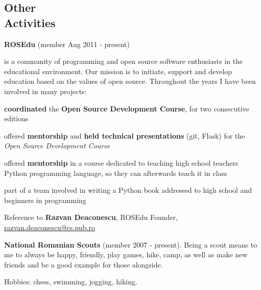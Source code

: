 \documentclass[margin,line]{resume}
\begin{document}
\begin{resume}
    \section{\mysidestyle Other\\Activities}

    \textbf{ROSEdu} (member Aug 2011 - present)
    {\fontsize{2.65mm}{1em}\selectfont
      is a community of
      programming and open source software enthusiasts in the educational environment. Our mission is to
      initiate, support and develop education based on the values of open source.\vspace{1mm}
      Throughout the years I have been involved in many projects:
      \begin{list2}
          \item \textbf{coordinated} the \textbf{Open Source Development Course}, for two consecutive editions
          \item offered \textbf{mentorship} and \textbf{held technical presentations} (git, Flask) for the \textit{Open Source Development Course}
          \item offered \textbf{mentorship} in a course dedicated to teaching high school teachers Python programming language, so they can afterwards teach it in class
          \item part of a team involved in writing a Python book addressed to high school and beginners in programming
      \end{list2}\vspace{-3.5mm}
      Reference to \textbf{Razvan Deaconescu}, ROSEdu Founder, \href{mailto:razvan.deaconescu@cs.pub.ro}{razvan.deaconescu@cs.pub.ro}
    }\vspace{-1mm}

    \textbf{National Romanian Scouts} (member 2007 - present).
    {\fontsize{2.65mm}{1em}\selectfont
      Being a scout means to me to always be happy, friendly, play games, hike, camp, as well as make new friends and be a good example for those alongside.
    }\vspace{-1mm}

    Hobbies: chess, swimming, jogging, hiking.



\end{resume}
\end{document}
